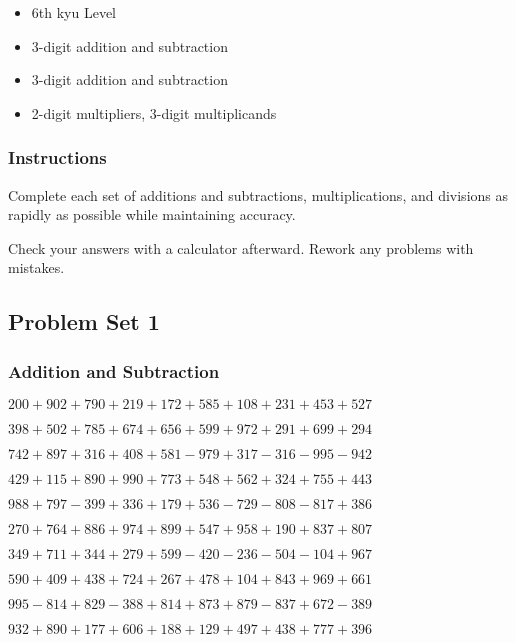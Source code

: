 \begin{itemize}
\item
  6th kyu Level
\item
  3-digit addition and subtraction
\item
  3-digit addition and subtraction
\item
  2-digit multipliers, 3-digit multiplicands
\end{itemize}

\hypertarget{instructions-2}{%
\subsubsection{Instructions}\label{instructions-2}}

Complete each set of additions and subtractions, multiplications, and
divisions as rapidly as possible while maintaining accuracy.

Check your answers with a calculator afterward. Rework any problems with
mistakes.

\hypertarget{problem-set-1-2}{%
\subsection{Problem Set 1}\label{problem-set-1-2}}

\hypertarget{addition-and-subtraction-101}{%
\subsubsection{Addition and
Subtraction}\label{addition-and-subtraction-101}}

\(200 + 902 + 790 + 219 + 172 + 585 + 108 + 231 + 453 + 527\)

\(398 + 502 + 785 + 674 + 656 + 599 + 972 + 291 + 699 + 294\)

\(742 + 897 + 316 + 408 + 581 - 979 + 317 - 316 - 995 - 942\)

\(429 + 115 + 890 + 990 + 773 + 548 + 562 + 324 + 755 + 443\)

\(988 + 797 - 399 + 336 + 179 + 536 - 729 - 808 - 817 + 386\)

\(270 + 764 + 886 + 974 + 899 + 547 + 958 + 190 + 837 + 807\)

\(349 + 711 + 344 + 279 + 599 - 420 - 236 - 504 - 104 + 967\)

\(590 + 409 + 438 + 724 + 267 + 478 + 104 + 843 + 969 + 661\)

\(995 - 814 + 829 - 388 + 814 + 873 + 879 - 837 + 672 - 389\)

\(932 + 890 + 177 + 606 + 188 + 129 + 497 + 438 + 777 + 396\)

